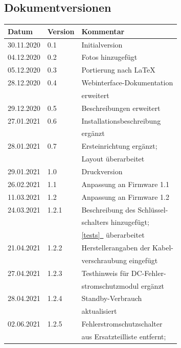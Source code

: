 \documentclass[a4paper,10pt]{article}
\newcommand*{\fullref}[1]{\hyperref[{#1}]{\ref*{#1}~\nameref*{#1}}}
\begin{document}
\begin{multicols*}{2}
	\section{Dokumentversionen}
	\begin{tabular}{lll}
		\toprule
		Datum      & Version & Kommentar                   \\
		\midrule
		30.11.2020 & 0.1     & Initialversion              \\
		04.12.2020 & 0.2     & Fotos hinzugefügt           \\
		05.12.2020 & 0.3     & Portierung nach \LaTeX      \\
		28.12.2020 & 0.4     & Webinterface-Dokumentation  \\
		           &         & erweitert                   \\
		29.12.2020 & 0.5     & Beschreibungen erweitert    \\
		27.01.2021 & 0.6     & Installationsbeschreibung   \\
		           &         & ergänzt                     \\
		28.01.2021 & 0.7     & Ersteinrichtung ergänzt;    \\
		           &         & Layout überarbeitet         \\
		29.01.2021 & 1.0     & Druckversion                \\
		26.02.2021 & 1.1     & Anpassung an Firmware 1.1   \\
		11.03.2021 & 1.2     & Anpassung an Firmware 1.2   \\
		24.03.2021 & 1.2.1   & Beschreibung des Schlüssel- \\
		           &         & schalters hinzugefügt;      \\
		           &         & \fullref{tests} überarbeitet\\
		21.04.2021 & 1.2.2   & Herstellerangaben der Kabel-\\
		           &         & verschraubung eingefügt     \\
		27.04.2021 & 1.2.3   & Testhinweis für DC-Fehler-  \\
		           &         & stromschutzmodul ergänzt    \\
		28.04.2021 & 1.2.4   & Standby-Verbrauch           \\
		           &         & aktualisiert                \\
		02.06.2021 & 1.2.5   & Fehlerstromschutzschalter   \\
		           &         & aus Ersatzteilliste entfernt;\\

\end{tabular}
\end{multicols*}
\end{document}
